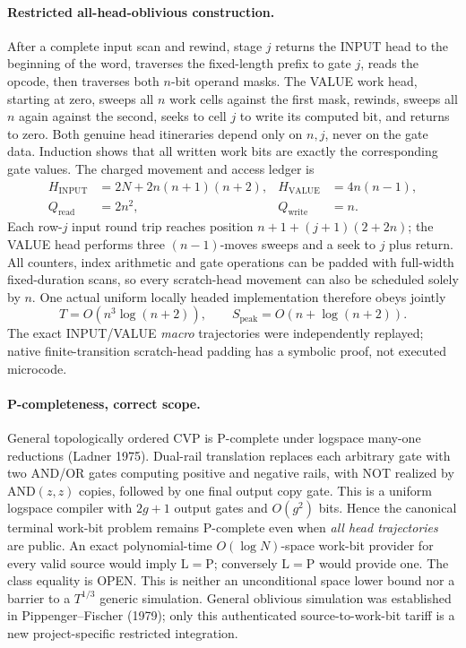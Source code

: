 \documentclass[11pt]{article}
\begin{document}
\paragraph{Restricted all-head-oblivious construction.}
After a complete input scan and rewind, stage $j$ returns
the INPUT head to the beginning of the word, traverses the
fixed-length prefix to gate $j$, reads the opcode, then traverses
both $n$-bit operand masks. The VALUE work head, starting
at zero, sweeps all $n$ work cells against the first mask,
rewinds, sweeps all $n$ again against the second, seeks to
cell $j$ to write its computed bit, and returns to zero.
Both genuine head itineraries depend only on $n,j$, never
on the gate data. Induction shows that all written work bits
are exactly the corresponding gate values. The charged
movement and access ledger is
\[
\begin{aligned}
H_{\mathrm{INPUT}}&=2N+2n(n+1)(n+2),&
H_{\mathrm{VALUE}}&=4n(n-1),\\
Q_{\mathrm{read}}&=2n^2,&Q_{\mathrm{write}}&=n .
\end{aligned}
\]
Each row-$j$ input round trip reaches position
$n+1+(j+1)(2+2n)$; the VALUE head performs three
$(n-1)$-moves sweeps and a seek to $j$ plus return.
All counters, index arithmetic and gate operations can be
padded with full-width fixed-duration scans, so every
scratch-head movement can also be scheduled solely by $n$.
One actual uniform locally headed implementation therefore
obeys jointly
\[
\boxed{T=O(n^3\log(n+2)),\qquad
S_{\mathrm{peak}}=O(n+\log(n+2)).}
\]
The exact INPUT/VALUE \emph{macro} trajectories were
independently replayed; native finite-transition scratch-head
padding has a symbolic proof, not executed microcode.

\paragraph{P-completeness, correct scope.}
General topologically ordered CVP is P-complete under
logspace many-one reductions (Ladner 1975).
Dual-rail translation replaces each arbitrary gate with
two AND/OR gates computing positive and negative rails,
with NOT realized by AND$(z,z)$ copies, followed by one
final output copy gate. This is a uniform logspace
compiler with $2g+1$ output gates and $O(g^2)$ bits.
Hence the canonical terminal work-bit problem remains
P-complete even when \emph{all head trajectories} are public.
An exact polynomial-time $O(\log N)$-space work-bit
provider for every valid source would imply
$\mathrm L=\mathrm P$; conversely $\mathrm L=\mathrm P$
would provide one. The class equality is OPEN.
This is neither an unconditional space lower bound nor
a barrier to a $T^{1/3}$ generic simulation.
General oblivious simulation was established in
Pippenger--Fischer (1979); only this authenticated
source-to-work-bit tariff is a new project-specific
restricted integration.
\end{document}
